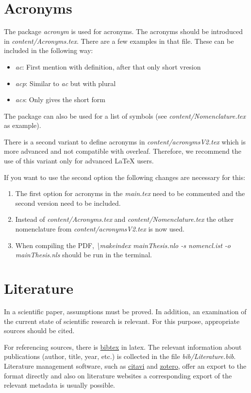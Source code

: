 \section{Acronyms}
\label{sec:abbrev}
The package \textit{acronym} is used for acronyms.
The acronyms should be introduced in \textit{content/Acronyms.tex}. There are a few examples in that file. These can be included in the following way:
\begin{itemize}
	\item \textit{ac}: First mention with definition, after that only short vresion
	\item \textit{acp}: Similar to \textit{ac} but with plural
	\item \textit{acs}: Only gives the short form
\end{itemize}

The package can also be used for a list of symbols (see \textit{content/Nomenclature.tex} as example).

There is a second variant to define acronyms in \textit{content/acronymsV2.tex} which is more advanced and not compatible with overleaf. Therefore, we recommend the use of this variant only for advanced LaTeX users.

If you want to use the second option the following changes are necessary for this:
\begin{enumerate}
	\item The first option for acronyms in the \textit{main.tex} need to be commented and the second version need to be included.
	\item Instead of \textit{content/Acronyms.tex} and \textit{content/Nomenclature.tex} the other nomenclature from \textit{content/acronymsV2.tex} is now used.
	\item When compiling the PDF, \textit{\textbackslash makeindex mainThesis.nlo -s nomencl.ist -o mainThesis.nls} should be run in the terminal.
\end{enumerate}

\section{Literature}
\label{sec:lit}

In a scientific paper, assumptions must be proved. In addition, an examination of the current state of scientific research is relevant. For this purpose, appropriate sources should be cited.

For referencing sources, there is \href{https://de.wikipedia.org/wiki/BibTeX}{bibtex} in latex.
The relevant information about publications (author, title, year, etc.) is collected in the file \textit{bib/Literature.bib}. Literature management software, such as \href{https://www.citavi.com/de}{citavi} and \href{https://www.zotero.org/}{zotero}, offer an export to the format directly and also on literature websites a corresponding export of the relevant metadata is usually possible.

